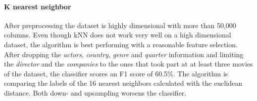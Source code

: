 
\paragraph{K nearest neighbor}
After preprocessing the dataset is highly dimensional with more than 50,000 columns. Even though kNN does not work very well on a high dimensional dataset, the algorithm is best performing with a reasonable feature selection. After dropping the \textit{actors}, \textit{country}, \textit{genre} and \textit{quarter} information and limiting the \textit{director} and the \textit{companies} to the ones that took part at at least three movies of the dataset, the classifier scores an F1 score of 60.5\%. The algorithm is comparing the labels of the 16 nearest neighbors calculated with the euclidean distance. Both down- and upsampling worsens the classifier. 
